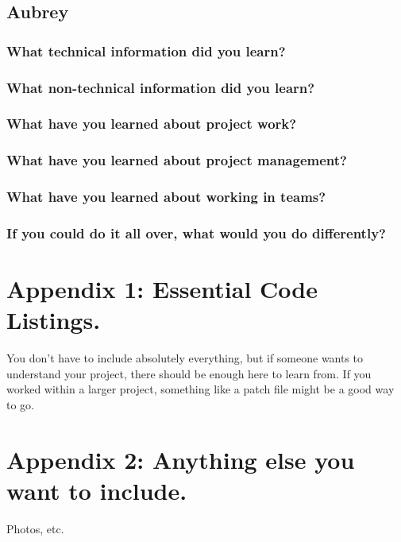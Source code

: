 \documentclass[journal,10pt,onecolumn,compsoc]{IEEEtran}
\begin{document}
    \subsection{Aubrey}
    \subsubsection{What technical information did you learn?}    
    \subsubsection{What non-technical information did you learn?}
    \subsubsection{What have you learned about project work?}
    \subsubsection{What have you learned about project management?}
    \subsubsection{What have you learned about working in teams?}
    \subsubsection{If you could do it all over, what would you do differently?} 
    \section{Appendix 1: Essential Code Listings.}
    You don't have to include absolutely everything, but if someone wants to understand your project, there should be enough here to learn from. If you worked within a larger project, something like a patch file might be a good way to go.
    
    
    \section{Appendix 2: Anything else you want to include.}
    Photos, etc.
    
    
    
    
\end{document}
